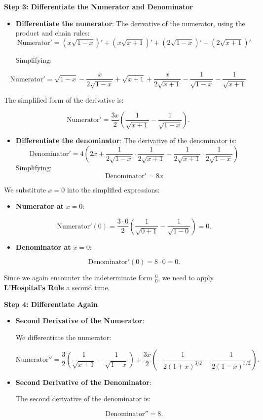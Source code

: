 \documentclass[
]{book}
\providecommand{\tightlist}{%
  \setlength{\itemsep}{0pt}\setlength{\parskip}{0pt}}
\begin{document}
\textbf{Step 3: Differentiate the Numerator and Denominator}

\begin{itemize}
\item
  \textbf{Differentiate the numerator}: The derivative of the numerator,
  using the product and chain rules: \[
    \text{Numerator}' = \left( x \sqrt{1 - x} \right)' + \left( x \sqrt{x + 1} \right)' + \left( 2 \sqrt{1 - x} \right)' - \left( 2 \sqrt{x + 1} \right)'
    \]

  Simplifying:
\end{itemize}

\[
    \text{Numerator}' = \sqrt{1 - x} - \frac{x}{2\sqrt{1 - x}} + \sqrt{x + 1} + \frac{x}{2\sqrt{x + 1}} - \frac{1}{\sqrt{1 - x}} - \frac{1}{\sqrt{x + 1}}
\]

The simplified form of the derivative is:

\[
\text{Numerator}' = \frac{3x}{2} \left( \frac{1}{\sqrt{x + 1}} - \frac{1}{\sqrt{1 - x}} \right).
\]

\begin{itemize}
\tightlist
\item
  \textbf{Differentiate the denominator}: The derivative of the
  denominator is: \[
    \text{Denominator}' = 4 \left( 2x + \frac{1}{2\sqrt{1 - x}} \cdot \frac{1}{2\sqrt{x + 1}} - \frac{1}{2\sqrt{x + 1}} \cdot \frac{1}{2\sqrt{1 - x}} \right)
    \] Simplifying: \[
    \text{Denominator}' = 8x
    \]
\end{itemize}

We substitute \(x = 0\) into the simplified expressions:

\begin{itemize}
\item
  \textbf{Numerator at} \(x = 0\):

  \[
    \text{Numerator}'(0) = \frac{3 \cdot 0}{2} \left( \frac{1}{\sqrt{0 + 1}} - \frac{1}{\sqrt{1 - 0}} \right) = 0.
  \]
\item
  \textbf{Denominator at} \(x = 0\):

  \[
    \text{Denominator}'(0) = 8 \cdot 0 = 0.
  \]
\end{itemize}

Since we again encounter the indeterminate form \(\frac{0}{0}\), we need
to apply \textbf{L'Hospital's Rule} a second time.

\textbf{Step 4: Differentiate Again}

\begin{itemize}
\item
  \textbf{Second Derivative of the Numerator}:

  We differentiate the numerator:

  \[
    \text{Numerator}'' = \frac{3}{2} \left( \frac{1}{\sqrt{x + 1}} - \frac{1}{\sqrt{1 - x}} \right) + \frac{3x}{2} \left( -\frac{1}{2(1 + x)^{3/2}} - \frac{1}{2(1 - x)^{3/2}} \right).
    \]
\item
  \textbf{Second Derivative of the Denominator}:

  The second derivative of the denominator is:

  \[
    \text{Denominator}'' = 8.
    \]
\end{itemize}
\end{document}
